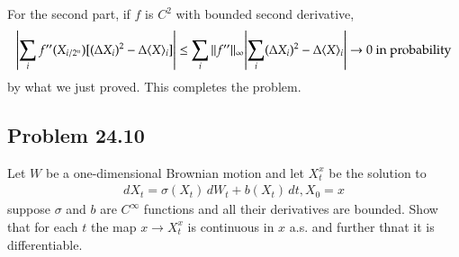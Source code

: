 \documentclass[12pt]{article}
\theoremstyle{definitionstyle}
\newcommand{\mg}[1]{\| #1 \|}
\newcommand{\1}{\mathds 1}
\newcommand{\qv}[1]{\langle #1 \rangle}
\begin{document}
    For the second part, if $f$ is $C^2$ with bounded second derivative, 
    \begin{align*}
        \qty|\sum_i f''(X_{i/2^n})[(\Delta X_i)^2 - \Delta \qv{X}_i]| \leq \sum_i \mg{f''}_\infty \qty|\sum_i (\Delta X_i)^2 - \Delta \qv{X}_i| \to 0 \text{ in probability}
    \end{align*}
    by what we just proved. This completes the problem.
    
    \subsection*{Problem 24.10}
    Let $W$ be a one-dimensional Brownian motion and let $X_t^x$ be the solution to
    \begin{align*}
        dX_t = \sigma(X_t) \, dW_t + b(X_t) \, dt, X_0 = x
    \end{align*}
    suppose $\sigma$ and $b$ are $C^\infty$ functions and all their derivatives are bounded. Show that for each $t$ the map $x \to X_t^x$ is continuous in $x$ a.s. and further thnat it is differentiable. 
\end{document}
